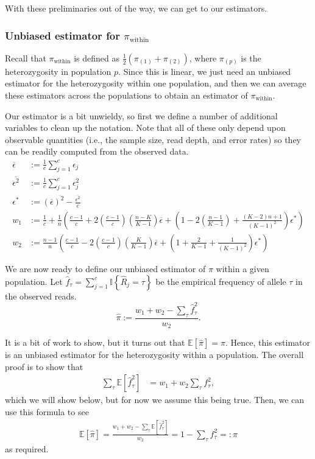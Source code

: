 \documentclass[letterpaper,fontsize=9pt,DIV=12]{scrartcl}
\newcommand*{\piw}{$\pi_\text{within}$\xspace}
\begin{document}
With these preliminaries out of the way, we can get to our estimators.


\subsubsection*{Unbiased estimator for \piw}
\label{supp:sec:FST:sub:HeterozygositySequencingError:sub:UnbiasedPIW}

Recall that \piw is defined as $\frac{1}{2}\left(\pi_{(1)} + \pi_{(2)}\right)$, where $\pi_{(p)}$ is the heterozygosity in population $p$.  Since this is linear, we just need an unbiased estimator for the heterozygosity within one population, and then we can average these estimators across the populations to obtain an estimator of \piw.

Our estimator is a bit unwieldy, so first we define a number of additional variables to clean up the notation.  Note that all of these only depend upon observable quantities (i.e., the sample size, read depth, and error rates) so they can be readily computed from the observed data.
\begin{align*}
\overline{\epsilon} &:= \frac{1}{c} \sum_{j=1}^c \epsilon_j\\
\overline{\epsilon^2} &:= \frac{1}{c} \sum_{j=1}^c \epsilon_j^2\\
\epsilon^* &:= (\overline{\epsilon})^2 - \frac{\overline{\epsilon^2}}{c}\\
w_1 &:= \frac{1}{c} + \frac{1}{n}\left(\frac{c-1}{c} + 2\left(\frac{c-1}{c}\right)\left(\frac{n-K}{K-1}\right)\overline{\epsilon} + \left(1 - 2\left(\frac{n-1}{K-1}\right) + \frac{(K-2)n + 1}{(K-1)^2}\right)\epsilon^*\right)\\
w_2 &:= \frac{n-1}{n}\left(\frac{c-1}{c} - 2\left(\frac{c-1}{c}\right)\left(\frac{K}{K-1}\right)\overline{\epsilon} + \left(1 + \frac{2}{K-1} + \frac{1}{(K-1)^2}\right)\epsilon^*\right)
\end{align*}

We are now ready to define our unbiased estimator of $\pi$ within a given population.  Let $\hat{f}_\tau = \sum_{j=1}^c \mathbb{I}\left\{\hat{R}_j = \tau\right\}$ be the empirical frequency of allele $\tau$ in the observed reads.
\[
\widehat{\pi} := \frac{w_1 + w_2 - \sum_\tau \hat{f}_\tau^2}{w_2}.
\]

It is a bit of work to show, but it turns out that $\mathbb{E}[\widehat{\pi}] = \pi$. Hence, this estimator is an unbiased estimator for the heterozygosity within a population.  The overall proof is to show that
\begin{align}
\sum_\tau\mathbb{E}\left[\hat{f}_\tau^2\right] &= w_1 + w_2 \sum_\tau f_\tau^2, \label{eq:lemma}
\end{align}
which we will show below, but for now we assume this being true.  Then, we can use this formula to see
\begin{align*}
\mathbb{E}\left[\widehat{\pi}\right] = \frac{w_1 + w_2 - \sum_\tau \mathbb{E}\left[\hat{f}_\tau^2\right]}{w_2} = 1 -\sum_\tau f_\tau^2 =: \pi
\end{align*}
as required.
\end{document}
